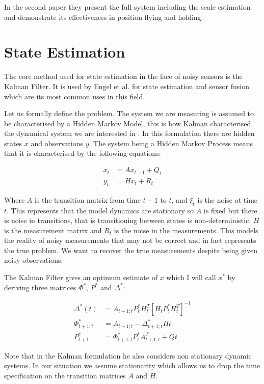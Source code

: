 \documentclass[]{../resources/final_report}
\begin{document}
In the second paper \cite{Engel:FigureFlying} they present the full system including the scale 
estimation and demonstrate its effectiveness in position flying and holding.


\section{State Estimation}

The core method used for state estimation in the face of noisy sensors is the Kalman Filter. It is 
used by Engel et al.\cite{Engel:Camera-basedNav} for state estimation and sensor fusion which are 
its most common uses in this field.

Let us formally define the problem. The system we are measuring is assumed to be characterised by a 
Hidden Markov Model, this is how Kalman characterised the dynamical system we are interested in \cite{Kalman1960ANA}. 
In this formulation there are hidden states $x$ and observations $y$. The system being a Hidden 
Markov Process means that it is characterised by the following equations:

\begin{align}
  x_t &= Ax_{t-1} + Q_t \\
  y_t &= Hx_t + R_t
\end{align}

Where $A$ is the transition matrix from time $t-1$ to $t$, and $\xi_t$ is the noise at time $t$. 
This represents that the model dynamics are stationary so $A$ is fixed but there is noise in 
transitions, that is transitioning between states is non-deterministic. $H$ is the measurement 
matrix and $R_t$ is the noise in the measurements. This models the reality of noisy measurements 
that may not be correct and in fact represents the true problem. We want to recover the true 
measurements despite being given noisy observations.

The Kalman Filter gives an optimum estimate of $x$ which I will call $x^*$ by deriving three matrices 
$\Phi^*$, $P^*$ and $\Delta^*$:

\begin{align}
  \Delta^*(t) &= A_{t+1;t}P^*_tH^T_t[H_tP^*_tH^T_t]^{-1} \\
  \Phi^*_{t+1;t} &= A_{t+1;t} - \Delta^*_{t+1;t}H{t} \\
  P^*_{t+1} &= \Phi^*_{t+1;t}P^*_tA^T_{t+1;t} + Q{t}
\end{align}

\pagebreak
Note that in the Kalman formulation he also considers non stationary dynamic systems. In our 
situation we assume stationarity which allows us to drop the time specification on the transition 
matrices $A$ and $H$.
\end{document}
